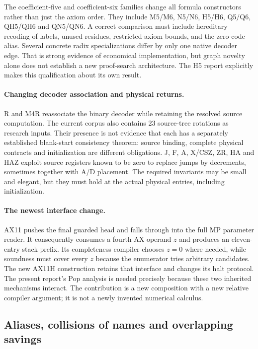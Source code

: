 The coefficient-five and coefficient-six families change all formula
constructors rather than just the axiom order.  They include M5/M6,
N5/N6, H5/H6, Q5/Q6, QH5/QH6 and QN5/QN6.  A correct comparison must include
hereditary recoding of labels, unused residues, restricted-axiom bounds,
and the zero-code alias.  Several concrete radix specializations differ
by only one native decoder edge.  That is strong evidence of economical
implementation, but graph novelty alone does not establish a new
proof-search architecture.  The H5 report explicitly makes this
qualification about its own result.

\paragraph{Changing decoder association and physical returns.}
R and M4R reassociate the binary decoder while retaining the resolved
source computation.  The current corpus also contains 23 source-tree
rotations as research inputs.  Their presence is not evidence that each
has a separately established blank-start consistency theorem: source
binding, complete physical contracts and initialization are different
obligations.  J, F, A, X/CSZ, ZR, HA and HAZ exploit source registers known
to be zero to replace jumps by decrements, sometimes together with A/D
placement.  The required invariants may be small and elegant, but they
must hold at the actual physical entries, including initialization.

\paragraph{The newest interface change.}
AX11 pushes the final guarded head and falls through into the full MP
parameter reader.  It consequently consumes a fourth AX operand $z$
and produces an eleven-entry stack prefix.  Its completeness compiler
chooses $z=0$ where needed, while soundness must cover every $z$ because
the enumerator tries arbitrary candidates.  The new AX11H construction
retains that interface and changes its halt protocol.  The present
report's Pop analysis is needed precisely because these two inherited
mechanisms interact.  The contribution is a new composition with a new
relative compiler argument; it is not a newly invented numerical calculus.
\cite{ax11packet}

\subsection{Aliases, collisions of names and overlapping savings}
\label{cmp:aliases}

